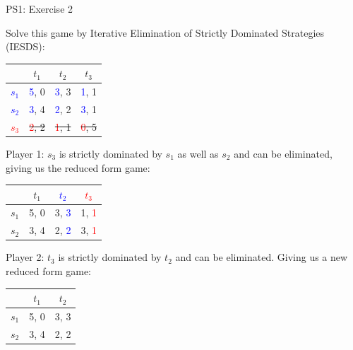 \begin{frame}{PS1: Exercise 2}
\begin{multicols}{2}
Solve this game by Iterative Elimination of Strictly Dominated Strategies (IESDS):
\begin{table}
  \begin{tabular}{c|c|c|c}
          & $t_1$ & $t_2$ & $t_3$ \\
    \midrule
    \textcolor{blue}{$s_1$} & \textcolor{blue}{5}, 0  & \textcolor{blue}{3}, 3  & \textcolor{blue}{1}, 1 \\
    \midrule
    \textcolor{blue}{$s_2$} & \textcolor{blue}{3}, 4  & \textcolor{blue}{2}, 2  & \textcolor{blue}{3}, 1 \\
    \midrule
    \sout{\textcolor{red}{$s_3$}} & \sout{\textcolor{red}{2}, 2}  & \sout{\textcolor{red}{1}, 1}  & \sout{\textcolor{red}{0}, 5}
  \end{tabular}
\end{table}
Player 1: $s_3$ is strictly dominated by $s_1$ as well as $s_2$ and can be eliminated, giving us the reduced form game:
\begin{table}
  \begin{tabular}{c|c|c|c}
          & $t_1$ & \textcolor{blue}{$t_2$} & \textcolor{red}{$t_3$} \\
    \midrule
    $s_1$ & 5, 0  & 3, \textcolor{blue}{3}  & 1, \textcolor{red}{1} \\
    \midrule
    $s_2$ & 3, 4  & 2, \textcolor{blue}{2}  & 3, \textcolor{red}{1}
  \end{tabular}
\end{table}
Player 2: $t_3$ is strictly dominated by $t_2$ and can be eliminated.
\vfill\null \columnbreak
Giving us a new reduced form game:
\begin{table}
  \begin{tabular}{c|c|c}
          & $t_1$ & $t_2$ \\
    \midrule
    $s_1$ & 5, 0  & 3, 3  \\
    \midrule
    $s_2$ & 3, 4  & 2, 2
  \end{tabular}
\end{table}
\vfill\null
\end{multicols}
\end{frame}

